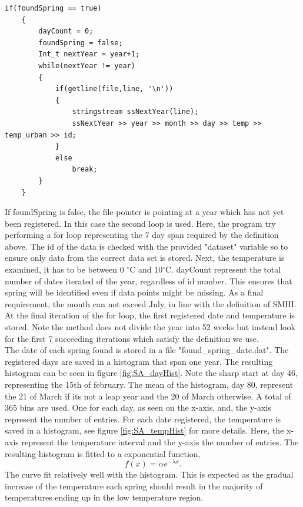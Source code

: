 \documentclass[a4paper,12pt]{article}
\begin{document}
\begin{lstlisting}
if(foundSpring == true)
	{
		dayCount = 0;
		foundSpring = false;
		Int_t nextYear = year+1;
		while(nextYear != year)
		{
			if(getline(file,line, '\n'))
			{
				stringstream ssNextYear(line);
				ssNextYear >> year >> month >> day >> temp >> temp_urban >> id; 
			}
			else
				break;
		}
	}
\end{lstlisting}
If foundSpring is false, the file pointer is pointing at a year which 
has not yet been registered. In this case the second loop is used. 
Here, the program try performing a for loop representing the 7 day span 
required by the definition above. The id of the data is checked with 
the provided "dataset" variable so to  ensure only data from the 
correct data set is stored. Next, the temperature is examined, it has 
to be between 0 $^\circ$C and 10$^\circ$C. dayCount represent the 
total number of dates iterated of the year, regardless of id number. 
This ensures that spring will be identified even if data points might 
be missing. As a final requirement, the month can not exceed July, in 
line with the definition of SMHI. At the final iteration of the for 
loop, the first registered date and temperature is stored. Note the 
method does not divide the year into 52 weeks but instead look for the 
first 7 succeeding iterations which satisfy the definition we use.
\\\indent
The date of each spring found is stored in a file 
"found\_spring\_date.dat". The registered days are saved in a histogram 
that span one year. The resulting histogram can be seen in figure 
\ref{fig:SA_dayHist}. Note the sharp start at day 46, representing the 
15th of february. The mean of the histogram, day 80, represent the 21 
of March if its not a leap year and the 20 of March otherwise. A total 
of 365 bins are used. One for each day, as seen on the x-axis, and, the 
y-axis represent the number of entries. For each date registered, the 
temperature is saved in a histogram, see figure \ref{fig:SA_tempHist} 
for more details. Here, the x-axis represent the temperature interval 
and the y-axis the number of entries. The resulting histogram is fitted 
to a exponential function,
\begin{equation}
	f(x)=\alpha e^{-\lambda x}.\label{eq:SA_fitfunc}
\end{equation}
The curve fit relatively well with the histogram. This is expected as 
the gradual increase of the temperature each spring should result in 
the majority of temperatures ending up in the low temperature region.
\end{document}
